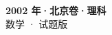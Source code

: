\documentclass[zihao=-4, a4paper]{ctexart}
\begin{document}
\begin{center}
  {\Large\bfseries 2002 年·北京卷·理科}\\[4pt]
  {\large 数学 · 试题版}
\end{center}
\medskip
{}

\end{document}
